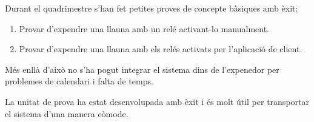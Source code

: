 Durant el quadrimestre s'han fet petites proves de concepte bàsiques amb èxit:
\begin{enumerate}
\vspace{-1em}
\item Provar d'expendre una llauna amb un relé activant-lo manualment.
\item Provar d'expendre una llauna amb els relés activats per l'aplicació de client.
\vspace{-1em}
\end{enumerate}

Més enllà d'això no s'ha pogut integrar el sistema dins de l'expenedor per problemes de calendari i falta de temps.

La unitat de prova ha estat desenvolupada amb èxit i és molt útil per transportar el sistema d'una manera còmode.

